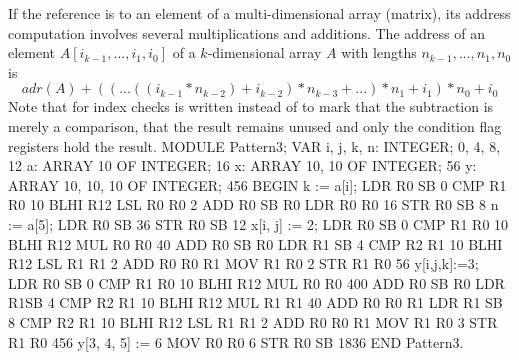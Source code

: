 If the reference is to an element of a multi-dimensional array (matrix), its address computation involves several multiplications and additions. The address of an element $A[i_{k-1}, ... , i_1, i_0]$ of a $k$-dimensional array $A$ with lengths $n_{k-1}, ... , n_1, n_0$ is
$$adr(A)+((...((i_{k-1} *n_{k-2})+i_{k-2})*n_{k-3} +...)*n_1 +i_1)*n_0 +i_0$$
Note that for index checks  is written instead of  to mark that the subtraction is merely a comparison, that the result remains unused and only the condition flag registers hold the result.
\begintt
MODULE Pattern3;
  VAR i, j, k, n: INTEGER;           0, 4, 8, 12
    a: ARRAY 10 OF INTEGER;          16
    x: ARRAY 10, 10 OF INTEGER;      56
    y: ARRAY 10, 10, 10 OF INTEGER;  456
BEGIN
  k := a[i];                         LDR  R0 SB 0
                                     CMP  R1 R0 10
                                     BLHI R12
                                     LSL  R0 R0 2
                                     ADD  R0 SB R0
                                     LDR  R0 R0 16
                                     STR  R0 SB 8
  n := a[5];                         LDR  R0 SB 36
                                     STR  R0 SB 12
  x[i, j] := 2;                      LDR  R0 SB 0
                                     CMP  R1 R0 10
                                     BLHI R12
                                     MUL  R0 R0 40
                                     ADD  R0 SB R0
                                     LDR  R1 SB 4
                                     CMP  R2 R1 10
                                     BLHI R12
                                     LSL  R1 R1 2
                                     ADD  R0 R0 R1
                                     MOV  R1 R0 2
                                     STR  R1 R0 56
  y[i,j,k]:=3;                       LDR  R0 SB 0
                                     CMP  R1 R0 10
                                     BLHI R12
                                     MUL  R0 R0 400
                                     ADD  R0 SB R0
                                     LDR  R1SB 4
                                     CMP  R2 R1 10
                                     BLHI R12
                                     MUL  R1 R1 40
                                     ADD  R0 R0 R1
                                     LDR  R1 SB 8
                                     CMP  R2 R1 10
                                     BLHI R12
                                     LSL  R1 R1 2
                                     ADD  R0 R0 R1
                                     MOV  R1 R0 3
                                     STR  R1 R0 456
  y[3, 4, 5] := 6                    MOV  R0 R0 6
                                     STR  R0 SB 1836
END Pattern3.
\endtt

